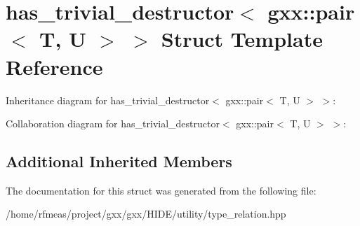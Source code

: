 \hypertarget{structhas__trivial__destructor_3_01gxx_1_1pair_3_01T_00_01U_01_4_01_4}{}\section{has\+\_\+trivial\+\_\+destructor$<$ gxx\+:\+:pair$<$ T, U $>$ $>$ Struct Template Reference}
\label{structhas__trivial__destructor_3_01gxx_1_1pair_3_01T_00_01U_01_4_01_4}


Inheritance diagram for has\+\_\+trivial\+\_\+destructor$<$ gxx\+:\+:pair$<$ T, U $>$ $>$\+:


Collaboration diagram for has\+\_\+trivial\+\_\+destructor$<$ gxx\+:\+:pair$<$ T, U $>$ $>$\+:
\subsection*{Additional Inherited Members}


The documentation for this struct was generated from the following file\+:\begin{DoxyCompactItemize}
\item 
/home/rfmeas/project/gxx/gxx/\+H\+I\+D\+E/utility/type\+\_\+relation.\+hpp\end{DoxyCompactItemize}
